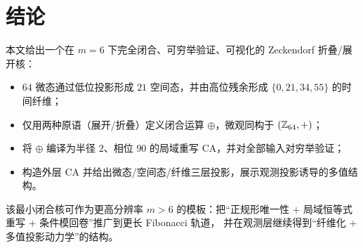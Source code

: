 \section{结论}

本文给出一个在 $m=6$ 下完全闭合、可穷举验证、可视化的 Zeckendorf 折叠/展开核：
\begin{itemize}
  \item $64$ 微态通过低位投影形成 $21$ 空间态，并由高位残余形成 $\{0,21,34,55\}$ 的时间纤维；
  \item 仅用两种原语（展开/折叠）定义闭合运算 $\oplus$，微观同构于 $(\mathbb{Z}_{64},+)$；
  \item 将 $\oplus$ 编译为半径 $2$、相位 $90$ 的局域重写 CA，并对全部输入对穷举验证；
  \item 构造外层 CA 并给出微态/空间态/纤维三层投影，展示观测投影诱导的多值结构。
\end{itemize}

该最小闭合核可作为更高分辨率 $m>6$ 的模板：把“正规形唯一性 + 局域恒等式重写 + 条件模回卷”推广到更长 Fibonacci 轨道，
并在观测层继续得到“纤维化 + 多值投影动力学”的结构。

